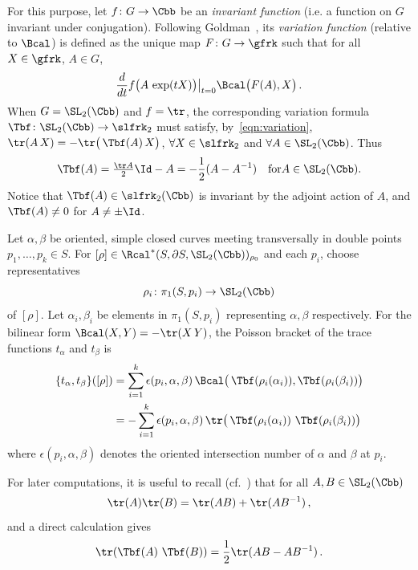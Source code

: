 For this purpose, let $f\colon G\to\Cbb$ be an \emph{invariant function} (i.e. a function on $G$ invariant under conjugation). Following Goldman~\cite{GoldmanComplex}, its \emph{variation function} (relative to $\Bcal$) is defined as the unique map $F\colon G\to\gfrk$ such that for all $X\in\gfrk$, $A\in G$,
\begin{equation}\label{eqn:variation}
\frac{d}{dt} f\big(A \, \exp(tX)\big) \big|_{t=0} \Bcal\big(F(A),X\big)\,.
\end{equation}
When $G=\SL_2(\Cbb)$ and $f=\tr$, the corresponding variation formula $\operatorname{\Tbf}\colon\SL_2(\Cbb)\to\slfrk_2$ must satisfy, by~\eqref{eqn:variation}, $\tr(A \, X) = - \tr\big(\operatorname{\Tbf}(A)\,X\big)$, $\forall X\in\slfrk_2$ and $ \forall A\in\SL_2(\Cbb)$. Thus
\[
\operatorname{\Tbf}(A)=\tfrac{\tr A}{2} \Id -A =-\frac{1}{2}(A-A^{-1}) \quad \text{for}A \in \SL_2(\Cbb).
\]
Notice that $\operatorname{\Tbf} (A)\in \slfrk_2 (\Cbb)$ is invariant by the adjoint action of $A$, and $\operatorname{\Tbf}(A)\neq 0$ for $A\neq\pm\Id$.

\begin{prop}\label{Prop:GoldmanPoisson}
Let $\alpha,\beta$ be oriented, simple closed curves meeting transversally in double points $p_1,\dots,p_k\in S$. For $[\rho]\in\Rcal^*(S,\partial S, \SL_2(\Cbb))_{\rho_0}$ and each $p_i$, choose representatives
\[
\rho_i\colon\pi_1(S,p_i)\to \SL_2(\Cbb)
\]
of $[\rho]$. Let $\alpha_i,\beta_i$ be elements in $\pi_1(S,p_i)$ representing $\alpha,\beta$ respectively. For the bilinear form $\Bcal(X,Y)= -\tr (X\, Y)$, the Poisson bracket of the trace functions $t_\alpha$ and $t_\beta$ is
\begin{align*}
\{t_\alpha, t_\beta \}([\rho]) &=
\sum_{i=1}^k \epsilon(p_i,\alpha,\beta)\,
\Bcal\big(\operatorname{\Tbf}(\rho_i(\alpha_i)), \operatorname{\Tbf}(\rho_i(\beta_i))\big) \\
&=-
\sum_{i=1}^k \epsilon(p_i,\alpha,\beta)\,
\tr
\big(\operatorname{\Tbf}(\rho_i(\alpha_i))\,\operatorname{\Tbf}(\rho_i(\beta_i))\big)
\end{align*}
where $\epsilon(p_i,\alpha,\beta)$ denotes the oriented intersection number of $\alpha$ and $\beta$ at $p_i$.
\end{prop}


For later computations, it is useful to recall (cf.~\cite{AcunaMontesinos}) that for all $A,B\in \SL_2(\Cbb)$
\begin{equation}\label{eqn:trace}
\tr(A) \tr(B)=\tr(A B) +\tr(A B^{-1})\,,
\end{equation}
and a direct calculation gives
\begin{equation}\label{eqn:traceInvariant}
\tr(\operatorname{\Tbf}(A)\, \operatorname{\Tbf}(B))=
\frac{1}{2} \tr(AB-AB^{-1})\,.
\end{equation}



